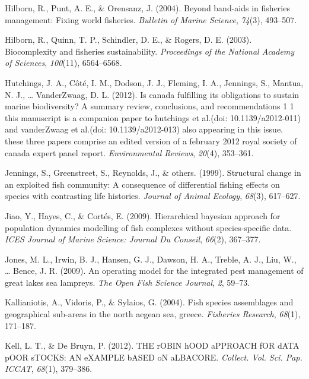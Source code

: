 \documentclass[12pt,]{scrartcl}
\begin{document}
\hypertarget{ref-hilborn2004beyond}{}
Hilborn, R., Punt, A. E., \& Orensanz, J. (2004). Beyond band-aids in
fisheries management: Fixing world fisheries. \emph{Bulletin of Marine
Science}, \emph{74}(3), 493--507.

\hypertarget{ref-hilborn2003biocomplexity}{}
Hilborn, R., Quinn, T. P., Schindler, D. E., \& Rogers, D. E. (2003).
Biocomplexity and fisheries sustainability. \emph{Proceedings of the
National Academy of Sciences}, \emph{100}(11), 6564--6568.

\hypertarget{ref-hutchings2012canada}{}
Hutchings, J. A., Côté, I. M., Dodson, J. J., Fleming, I. A., Jennings,
S., Mantua, N. J., \ldots{} VanderZwaag, D. L. (2012). Is canada
fulfilling its obligations to sustain marine biodiversity? A summary
review, conclusions, and recommendations 1 1 this manuscript is a
companion paper to hutchings et al.(doi: 10.1139/a2012-011) and
vanderZwaag et al.(doi: 10.1139/a2012-013) also appearing in this issue.
these three papers comprise an edited version of a february 2012 royal
society of canada expert panel report. \emph{Environmental Reviews},
\emph{20}(4), 353--361.

\hypertarget{ref-jennings1999structural}{}
Jennings, S., Greenstreet, S., Reynolds, J., \& others. (1999).
Structural change in an exploited fish community: A consequence of
differential fishing effects on species with contrasting life histories.
\emph{Journal of Animal Ecology}, \emph{68}(3), 617--627.

\hypertarget{ref-jiao2009hierarchical}{}
Jiao, Y., Hayes, C., \& Cortés, E. (2009). Hierarchical bayesian
approach for population dynamics modelling of fish complexes without
species-specific data. \emph{ICES Journal of Marine Science: Journal Du
Conseil}, \emph{66}(2), 367--377.

\hypertarget{ref-jones2009operating}{}
Jones, M. L., Irwin, B. J., Hansen, G. J., Dawson, H. A., Treble, A. J.,
Liu, W., \ldots{} Bence, J. R. (2009). An operating model for the
integrated pest management of great lakes sea lampreys. \emph{The Open
Fish Science Journal}, \emph{2}, 59--73.

\hypertarget{ref-kallianiotis2004fish}{}
Kallianiotis, A., Vidoris, P., \& Sylaios, G. (2004). Fish species
assemblages and geographical sub-areas in the north aegean sea, greece.
\emph{Fisheries Research}, \emph{68}(1), 171--187.

\hypertarget{ref-kell2012robin}{}
Kell, L. T., \& De Bruyn, P. (2012). THE rOBIN hOOD aPPROACH fOR dATA
pOOR sTOCKS: AN eXAMPLE bASED oN aLBACORE. \emph{Collect. Vol. Sci. Pap.
ICCAT}, \emph{68}(1), 379--386.
\end{document}
